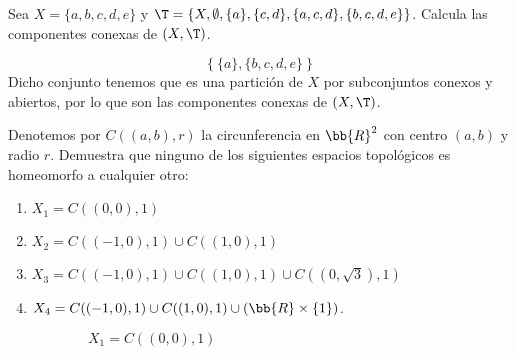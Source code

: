 \begin{ejercicio}
    Sea $ X = \{a, b, c, d, e\} $ y $ \T = \{X, \emptyset, \{a\}, \{c, d\}, \{a, c, d\}, \{b, c, d, e\}\} $. Calcula las componentes conexas de $(X, \T)$.

    \begin{equation*}
        \left\{\{a\}, \{b, c, d, e\}\right\}
    \end{equation*}
    Dicho conjunto tenemos que es una partición de $X$ por subconjuntos conexos y abiertos, por lo que son las componentes conexas de $(X, \T)$.
\end{ejercicio}

\begin{ejercicio}
    Denotemos por $ C((a, b), r) $ la circunferencia en $ \bb{R}^2 $ con centro $(a, b)$ y radio $r$. Demuestra que ninguno de los siguientes espacios topológicos es homeomorfo a cualquier otro:
    \begin{enumerate}
        \item $X_1 = C((0, 0), 1) $
        \item $X_2 = C((-1, 0), 1) \cup C((1, 0), 1) $
        \item $X_3 = C((-1, 0), 1) \cup C((1, 0), 1) \cup C\left(\left(0, \sqrt{3}\right), 1\right) $
        \item $X_4 = C((-1, 0), 1) \cup C((1, 0), 1) \cup (\bb{R} \times \{1\}) $.
    \end{enumerate}
    \begin{figure}[H]
        \begin{subfigure}[c]{0.5\linewidth}
            \centering
            \caption{$X_1 = C((0, 0), 1)$}
        \end{subfigure}\hfill
        \begin{subfigure}[c]{0.5\linewidth}
            \centering
\end{subfigure}
\end{figure}
\end{ejercicio}

